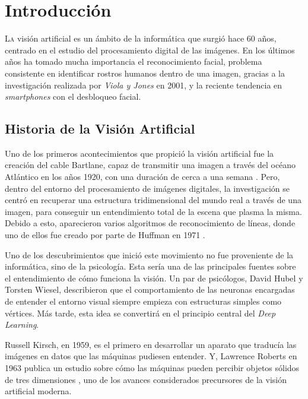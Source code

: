 
\chapter{Introducción}

\lettrine[lines=4]{L}{a} visión artificial  es un ámbito de la informática que surgió hace 60 años, centrado en el estudio del procesamiento digital de las imágenes. En los últimos años ha tomado mucha importancia el reconocimiento facial, problema consistente en identificar rostros humanos dentro de una imagen,  gracias a la investigación realizada por \textit{Viola y Jones} en 2001, y la reciente tendencia en \textit{smartphones} con el desbloqueo facial. 
\vspace*{-5mm}
\section{Historia de la Visión Artificial}
\vspace*{-5mm}
Uno de los primeros acontecimientos que propició la visión artificial fue la creación del cable Bartlane, capaz de transmitir una imagen a través del océano Atlántico en los años 1920, con una duración de cerca a una semana \cite{gonzalez_woods_2018}. Pero, dentro del entorno del procesamiento de imágenes digitales, la investigación se centró en recuperar una estructura tridimensional del mundo real a través de una imagen, para conseguir un entendimiento total de la escena que plasma la misma. Debido a esto, aparecieron varios algoritmos de reconocimiento de líneas, donde uno de ellos fue creado por parte de Huffman en 1971 \cite{szeliski_2018}.

Uno de los descubrimientos que inició este movimiento no fue proveniente de la informática, sino de la psicología. Esta sería una de las principales fuentes sobre el entendimiento de cómo funciona la visión.  Un par de psicólogos, David Hubel y Torsten Wiesel, describieron que el comportamiento de las neuronas encargadas de entender el entorno visual siempre empieza con estructuras simples como vértices. Más tarde, esta idea se convertirá en el principio central del \textit{Deep Learning}.

Russell Kirsch, en 1959, es el primero en desarrollar un aparato que traducía las imágenes en datos que las máquinas pudiesen entender. Y, Lawrence Roberts en 1963 publica un estudio sobre cómo las máquinas pueden percibir objetos sólidos de tres dimensiones \cite{histComputer}, uno de los avances considerados precursores de la visión artificial moderna.


